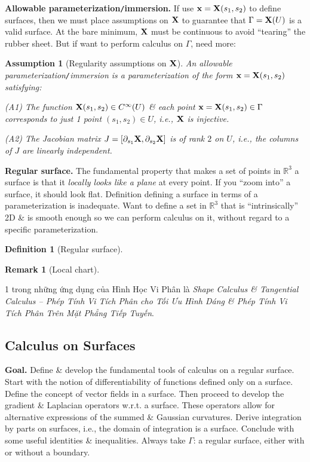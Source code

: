 \documentclass{article}
\newtheorem{assumption}{Assumption}
\newtheorem{definition}{Definition}
\newtheorem{remark}{Remark}
\begin{document}
\begin{enumerate}
	{\bf Allowable parameterization{\tt/}immersion.} If use ${\bf x} = {\bf X}(s_1,s_2)$ to define surfaces, then we must place assumptions on ${\bf X}$ to guarantee that $\Gamma = {\bf X}(U)$ is a valid surface. At the bare minimum, ${\bf X}$ must be continuous to avoid ``tearing'' the rubber sheet. But if want to perform calculus on $\Gamma$, need more:
	\begin{assumption}[Regularity assumptions on ${\bf X}$]
		An allowable parameterization{\tt/}immersion is a parameterization of the form ${\bf x} = {\bf X}(s_1,s_2)$ satisfying:
		\item[(A1)] The function ${\bf X}(s_1,s_2)\in C^\infty(U)$ \& each point ${\bf x} = {\bf X}(s_1,s_2)\in\Gamma$ corresponds to just 1 point $(s_1,s_2)\in U$, i.e., ${\bf X}$ is injective.
		\item[(A2)] The Jacobian matrix $J = [\partial_{s_1}{\bf X},\partial_{s_2}{\bf X}]$ is of rank $2$ on $U$, i.e., the columns of $J$ are linearly independent.
	\end{assumption}
	{\bf Regular surface.} The fundamental property that makes a set of points in $\mathbb{R}^3$ a surface is that it {\it locally looks like a plane} at every point. If you ``zoom into'' a surface, it should look flat. Definition defining a surface in terms of a parameterization is inadequate. Want to define a set in $\mathbb{R}^3$ that is ``intrinsically'' 2D \& is smooth enough so we can perform calculus on it, without regard to a specific parameterization.
	
	\begin{definition}[Regular surface]
		
	\end{definition}
	
	\begin{remark}[Local chart]
		
	\end{remark}
\end{enumerate}
1 trong những ứng dụng của Hình Học Vi Phân là {\it Shape Calculus \& Tangential Calculus -- Phép Tính Vi Tích Phân cho Tối Ưu Hình Dáng \& Phép Tính Vi Tích Phân Trên Mặt Phẳng Tiếp Tuyến}.

\subsection{Calculus on Surfaces}
{\bf Goal.} Define \& develop the fundamental tools of calculus on a regular surface. Start with the notion of differentiability of functions defined only on a surface. Define the concept of vector fields in a surface. Then proceed to develop the gradient \& Laplacian operators w.r.t. a surface. These operators allow for alternative expressions of the summed \& Gaussian curvatures. Derive integration by parts on surfaces, i.e., the domain of integration is a surface. Conclude with some useful identities \& inequalities. Always take $\Gamma$: a regular surface, either with or without a boundary.
\end{document}
